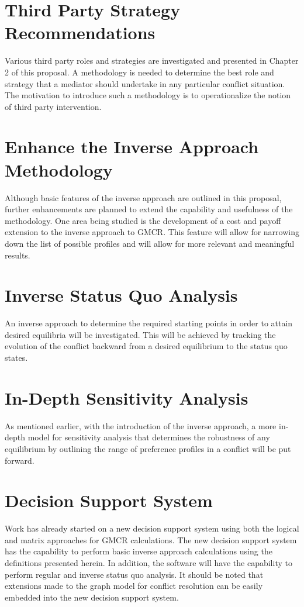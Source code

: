 \documentclass[letterpaper,12pt,titlepage,oneside,final]{book}
\begin{document}
\section{Third Party Strategy Recommendations}
Various third party roles and strategies are investigated and presented in Chapter 2 of this proposal. A methodology is needed to determine the best role and strategy that a mediator should undertake in any particular conflict situation. The motivation to introduce such a methodology is to operationalize the notion of third party intervention.

\section{Enhance the Inverse Approach Methodology}
Although basic features of the inverse approach are outlined in this proposal, further enhancements are planned to extend the capability and usefulness of the methodology. One area being studied is the development of a cost and payoff extension to the inverse approach to GMCR. This feature will allow for narrowing down the list of possible profiles and will allow for more relevant and meaningful results.

\section{Inverse Status Quo Analysis}
An inverse approach to determine the required starting points in order to attain desired equilibria will be investigated. This will be achieved by tracking the evolution of the conflict backward from a desired equilibrium to the status quo states.


\section{In-Depth Sensitivity Analysis}
As mentioned earlier, with the introduction of the inverse approach, a more in-depth model for sensitivity analysis that determines the robustness of any equilibrium by outlining the range of preference profiles in a conflict will be put forward. 

\section{Decision Support System}
Work has already started on a new decision support system using both the logical and matrix approaches for GMCR calculations. The new decision support system has the capability to perform basic inverse approach calculations using the definitions presented herein. In addition, the software will have the capability to perform regular and inverse status quo analysis. It should be noted that extensions made to the graph model for conflict resolution can be easily embedded into the new decision support system.
\end{document}
